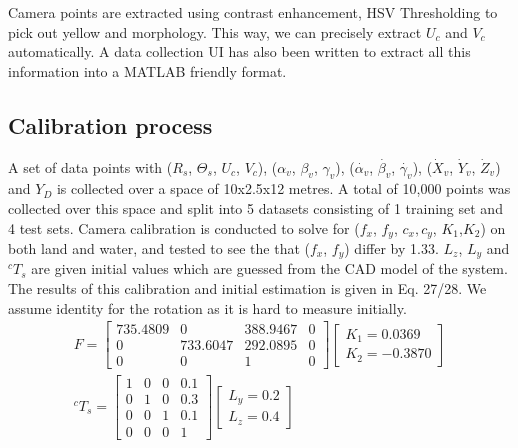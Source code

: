 \documentclass[15pt]{article}
\let\Theta\varTheta
\newcommand{\RSonar}{$\si{\textit{R}_{s}}$\xspace}
\newcommand{\ThetaSonar}{$\si{\Theta_{s}}$\xspace}
\newcommand{\UCamera}{$\si{\textit{U}_{c}}$\xspace}
\newcommand{\VCamera}{$\si{\textit{V}_{c}}$\xspace}
\newcommand{\YDepth}{$Y_{D}$\xspace}
\newcommand{\RollVehicle}{${\alpha_{v}}$\xspace}
\newcommand{\PitchVehicle}{${\beta_{v}}$\xspace}
\newcommand{\YawVehicle}{${\gamma_{v}}$\xspace}
\newcommand{\RollVehicleVelocity}{${\dot{\alpha_{v}}}$\xspace}
\newcommand{\PitchVehicleVelocity}{${\dot{\beta_{v}}}$\xspace}
\newcommand{\YawVehicleVelocity}{${\dot{\gamma_{v}}}$\xspace}
\newcommand{\XVehicleVelocity}{$\si{\dot{\textit{X}}_{v}}$\xspace}
\newcommand{\YVehicleVelocity}{$\si{\dot{\textit{Y}}_{v}}$\xspace}
\newcommand{\ZVehicleVelocity}{$\si{\dot{\textit{Z}}_{v}}$\xspace}
\begin{document}
Camera points are extracted using contrast enhancement, HSV Thresholding to pick out yellow and morphology. This way, we can precisely extract \UCamera and \VCamera automatically. A data collection UI has also been written to extract all this information into a MATLAB friendly format.

\subsection{Calibration process}

A set of data points with (\RSonar, \ThetaSonar, \UCamera, \VCamera), (\RollVehicle, \PitchVehicle, \YawVehicle), (\RollVehicleVelocity, \PitchVehicleVelocity, \YawVehicleVelocity), (\XVehicleVelocity, \YVehicleVelocity, \ZVehicleVelocity) and \YDepth is collected over a space of 10x2.5x12 metres. A total of 10,000 points was collected over this space and split into 5 datasets consisting of 1 training set and 4 test sets. Camera calibration is conducted to solve for ($f_{x}$, $f_{y}$, $c_{x}, c_{y}$, $K_{1}$,$K_{2}$) on both land and water, and tested to see the that ($f_{x}$, $f_{y}$) differ by 1.33. $L_{z}$, $L_{y}$ and $^{c}T_{s}$ are given initial values which are guessed from the CAD model of the system. The results of this calibration and initial estimation is given in Eq. 27/28. We assume identity for the rotation as it is hard to measure initially.
\begin{gather}
F=\left[\begin{array}{cccc}
735.4809 & 0 & 388.9467 & 0\\
0 & 733.6047 & 292.0895 & 0\\
0 & 0 & 1 & 0
\end{array}\right]
 \left[\begin{array}{c}
K_{1}=0.0369\\
K_{2}=-0.3870
\end{array}\right] \\
^{c}T_{s}=\left[\begin{array}{cccc}
1 & 0 & 0 & 0.1\\
0 & 1 & 0 & 0.3\\
0 & 0 & 1 & 0.1\\
0 & 0 & 0 & 1
\end{array}\right]
 \left[\begin{array}{c}
L_{y}=0.2\\
L_{z}=0.4
\end{array}\right]
\end{gather}
\end{document}
